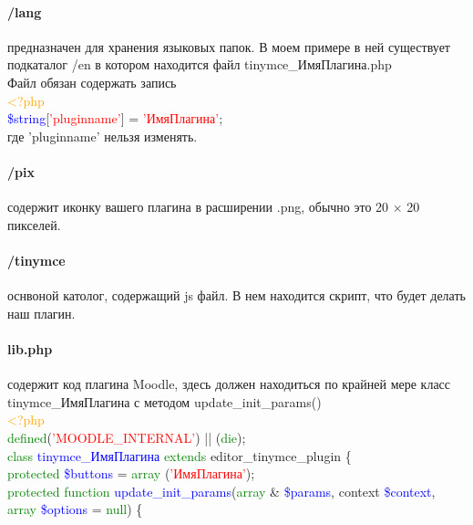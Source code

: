\documentclass[14pt,Diplom]{diplomwork}
\begin{document}
\paragraph{/lang}
 предназначен для хранения языковых папок. В моем примере в ней существует подкаталог /en в котором находится файл tinymce\_ИмяПлагина.php\\
 Файл обязан содержать запись\\
  \textcolor{orange}{<?php} \\
  \textcolor{blue}{\$string}[\textcolor{red}{'pluginname'}] = \textcolor{red}{'ИмяПлагина'};\\
  где 'pluginname' нельзя изменять.

\paragraph{/pix}
содержит иконку вашего плагина в расширении .png, обычно это 20 $\times$ 20 пикселей.

\paragraph{/tinymce}
оснвоной католог, содержащий js файл. В нем находится скрипт, что будет делать наш плагин.

\paragraph{lib.php}
содержит код плагина Moodle, здесь должен находиться по крайней мере класс tinymce\_ИмяПлагина с методом update\_init\_params()\\
 \textcolor{orange}{<?php} \\
 \textcolor{green}{defined}(\textcolor{red}{'MOODLE\_INTERNAL'}) || (\textcolor{green}{die});\\
 
\textcolor{green}{class} \textcolor{blue}{tinymce\_ИмяПлагина} \textcolor{green}{extends} editor\_tinymce\_plugin \{ \\
\textcolor{green}{protected} \textcolor{blue}{\$buttons} = \textcolor{green}{array} (\textcolor{red}{'ИмяПлагина'}); \\

\textcolor{green}{protected function} \textcolor{blue}{update\_init\_params}(\textcolor{green}{array} \& \textcolor{blue}{\$params}, context \textcolor{blue}{\$context}, \textcolor{green}{array} \textcolor{blue}{\$options} = \textcolor{green}{null}) \{ \\
\end{document}
